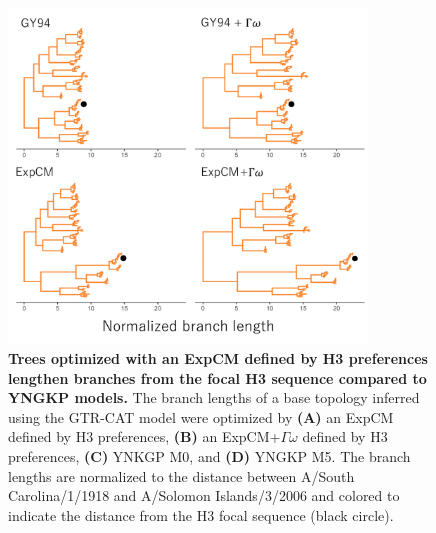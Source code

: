 \documentclass[11pt]{article}
\begin{document}
\begin{figure}[H]
\centerline{\includegraphics[width=0.85\textwidth]{figures/tree_lee}}
\caption{\label{fig:tree_lee}
\textbf{Trees optimized with an ExpCM defined by H3 preferences lengthen branches from the focal H3 sequence compared to YNGKP models.} 
The branch lengths of a base topology inferred using the GTR-CAT model were optimized by \textbf{(A)} an ExpCM defined by H3 preferences, \textbf{(B)} an ExpCM+$\Gamma\omega$ defined by H3 preferences, \textbf{(C)} YNKGP M0, and \textbf{(D)} YNGKP M5.
The branch lengths are normalized to the distance between A/South Carolina/1/1918 and A/Solomon Islands/3/2006 and colored to indicate the distance from the H3 focal sequence (black circle).
}
\end{figure}
\end{document}

